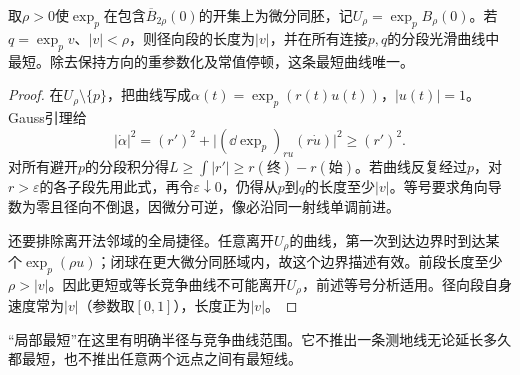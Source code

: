 \begin{proposition}[径向测地线的最短性]\label{prop:radial-minimizing}
取$\rho>0$使$\exp_p$在包含$\overline B_{2\rho}(0)$的开集上为微分同胚，记$U_\rho=\exp_p B_\rho(0)$。若$q=\exp_pv$、$|v|<\rho$，则径向段的长度为$|v|$，并在所有连接$p,q$的分段光滑曲线中最短。除去保持方向的重参数化及常值停顿，这条最短曲线唯一。
\end{proposition}
\begin{proof}
在$U_\rho\setminus\{p\}$，把曲线写成$\alpha(t)=\exp_p(r(t)u(t))$，$|u(t)|=1$。Gauss引理给
\[
 |\dot\alpha|^2=(r')^2+
 \bigl|(\dd\exp_p)_{ru}(r\dot u)\bigr|^2\geq(r')^2.
\]
对所有避开$p$的分段积分得$L\geq\int|r'|\geq r(\text{终})-r(\text{始})$。若曲线反复经过$p$，对$r>\varepsilon$的各子段先用此式，再令$\varepsilon\downarrow0$，仍得从$p$到$q$的长度至少$|v|$。等号要求角向导数为零且径向不倒退，因微分可逆，像必沿同一射线单调前进。

还要排除离开法邻域的全局捷径。任意离开$U_\rho$的曲线，第一次到达边界时到达某个$\exp_p(\rho u)$；闭球在更大微分同胚域内，故这个边界描述有效。前段长度至少$\rho>|v|$。因此更短或等长竞争曲线不可能离开$U_\rho$，前述等号分析适用。径向段自身速度常为$|v|$（参数取$[0,1]$），长度正为$|v|$。
\end{proof}

“局部最短”在这里有明确半径与竞争曲线范围。它不推出一条测地线无论延长多久都最短，也不推出任意两个远点之间有最短线。

